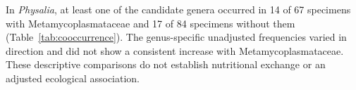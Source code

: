 In \textit{Physalia}, at least one of the candidate genera occurred in
14 of 67 specimens with Metamycoplasmataceae and
17 of 84 specimens without them
(Table~\ref{tab:cooccurrence}). The genus-specific unadjusted frequencies
varied in direction and did not show a consistent increase with
Metamycoplasmataceae. These descriptive comparisons do not establish
nutritional exchange or an adjusted ecological association.
